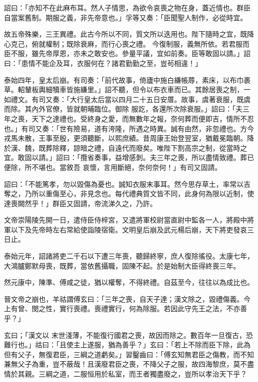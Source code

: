 \begin{pinyinscope}
 詔曰：「亦知不在此麻布耳。然人子情思，為欲令哀喪之物在身，蓋近情也。群臣自當案舊制。期服之義，非先帝意也。」孚等又奏：「臣聞聖人制作，必從時宜。



 故五帝殊樂，三王異禮。此古今所以不同，質文所以迭用也。陛下隨時之宜，既降心克己，俯就權制；既除衰麻，而行心喪之禮。
 今復制服，義無所依。若君服而臣不服，雖先帝厚恩，亦未之敢安也。參量平議，宜如前奏。臣等敢固以請。」詔曰：「患情不能企及耳，衣服何在？諸君勤勤之至，豈茍相違！」



 泰始四年，皇太后崩。有司奏：「前代故事，倚廬中施白縑帳蓐，素床，以布巾裹草。軺輦板輿細犢車皆施縑里。」詔不聽，但令以布衣車而已。其餘居喪之制，一如禮文。有司又奏：「大行皇太后當以四月二十五日安厝。故事，虞著衰服，既虞而除。其內外官僚，皆就朝晡臨位。御除
 服訖，各還所次除衰服。」詔曰：「夫三年之喪，天下之達禮也。受終身之愛，而無數年之報，奈何葬而便即吉，情所不忍也。」有司又奏：「世有險易，道有洿隆，所遇之時異。誠有由然，非忽禮也。方今戎馬未散，王事至殷，更須聽斷，以熙庶績。昔周康王始登翌室，猶戴冕臨朝。降於漢、魏，既葬除釋，諒暗之禮，自遠代而廢矣。唯陛下割高宗之制，從當時之宜。敢固以請。」詔曰：「攬省奏事，益增感剝。夫三年之喪，所以盡情致禮。葬已便除，所不堪也。當敘吾
 哀懷，言用斷絕，奈何奈何！」有司又固請。



 詔曰：「不能篤孝，勿以毀傷為憂也。誠知衣服末事耳。然今思存草土，率常以吉奪之，乃所以重傷至心，非見念也。每代禮典質文皆不同，此身何為限以近制，使達喪闕然乎！」群臣又固請，帝流涕久之，乃許。



 文帝崇陽陵先開一日，遣侍臣侍梓宮，又遣將軍校尉當直尉中監各一人，將殿中將軍以下及先帝時左右常給使詣陵宿衛。文明皇后崩及武元楊后崩，天下將吏發哀三日止。



 泰始元年，詔諸將吏二千石以下遭三年喪，聽歸終寧，庶人復除徭役。太康七年，大鴻臚鄭默母喪，既葬，當依舊攝職，固陳不起。於是始制大臣得終喪三年。



 然元康中，陳準、傅咸之徒，猶以權奪，不得終禮。自茲至今，往往以為成比也。



 晉文帝之崩也，羊祜謂傅玄曰：「三年之喪，自天子達；漢文除之，毀禮傷義。今上有曾、閔之性，實行喪禮。喪禮實行，何為除服。若因此守先王之法，不亦善乎？」



 玄曰；「漢文以
 末世淺薄，不能復行國君之喪，故因而除之。數百年一旦復古，恐難行也。」祜曰：「且使主上遂服，猶為善乎？」玄曰：「若上不除而臣下除，此為但有父子，無復君臣，三綱之道虧矣。」習鑿齒曰：「傅玄知無君臣之傷教，而不知兼無父子為重，豈不蔽哉！且漢廢君臣之喪，不降父子之服，故四海黎庶，莫不盡情於其親。三綱之道，二服恒用於私室，而王者獨盡廢之，豈所以孝治天下乎？




\end{pinyinscope}
